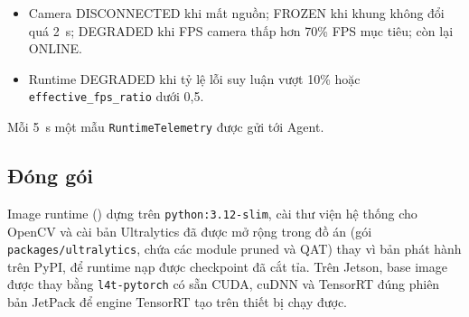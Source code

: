 \begin{itemize}
  \item Camera DISCONNECTED khi mất nguồn; FROZEN khi khung không đổi quá 2~s;
        DEGRADED khi FPS camera thấp hơn 70\% FPS mục tiêu; còn lại ONLINE.
  \item Runtime DEGRADED khi tỷ lệ lỗi suy luận vượt 10\% hoặc
        \texttt{effective\_fps\_ratio} dưới 0,5.
\end{itemize}

Mỗi 5~s một mẫu \texttt{RuntimeTelemetry} được gửi tới Agent.

\subsection{Đóng gói}

Image runtime () dựng trên
\texttt{python:3.12-slim}, cài thư viện hệ thống cho OpenCV và cài bản Ultralytics
đã được mở rộng trong đồ án (gói \texttt{packages/ultralytics}, chứa các module
pruned và QAT) thay vì bản phát hành trên PyPI, để runtime nạp được checkpoint
đã cắt tỉa. Trên Jetson, base image được thay bằng \texttt{l4t-pytorch} có sẵn
CUDA, cuDNN và TensorRT đúng phiên bản JetPack để engine TensorRT tạo trên thiết
bị chạy được.
